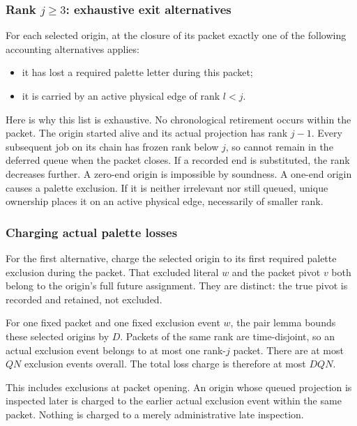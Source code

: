 \subsubsection{\texorpdfstring{Rank \(j\ge3\): exhaustive exit alternatives}{Rank j\textbackslash ge3: exhaustive exit alternatives}}\label{rank-jge3-exhaustive-exit-alternatives}

For each selected origin, at the closure of its packet exactly one of the following accounting alternatives applies:

\begin{itemize}
\tightlist
\item
  it has lost a required palette letter during this packet;
\item
  it is carried by an active physical edge of rank \(l<j\).
\end{itemize}

Here is why this list is exhaustive. No chronological retirement occurs within the packet. The origin started alive and its actual projection has rank \(j-1\). Every subsequent job on its chain has frozen rank below \(j\), so cannot remain in the deferred queue when the packet closes. If a recorded end is substituted, the rank decreases further. A zero-end origin is impossible by soundness. A one-end origin causes a palette exclusion. If it is neither irrelevant nor still queued, unique ownership places it on an active physical edge, necessarily of smaller rank.

\subsubsection{Charging actual palette losses}\label{charging-actual-palette-losses}

For the first alternative, charge the selected origin to its first required palette exclusion during the packet. That excluded literal \(w\) and the packet pivot \(v\) both belong to the origin's full future assignment. They are distinct: the true pivot is recorded and retained, not excluded.

For one fixed packet and one fixed exclusion event \(w\), the pair lemma bounds these selected origins by \(D\). Packets of the same rank are time-disjoint, so an actual exclusion event belongs to at most one rank-\(j\) packet. There are at most \(QN\) exclusion events overall. The total loss charge is therefore at most \(DQN\).

This includes exclusions at packet opening. An origin whose queued projection is inspected later is charged to the earlier actual exclusion event within the same packet. Nothing is charged to a merely administrative late inspection.

